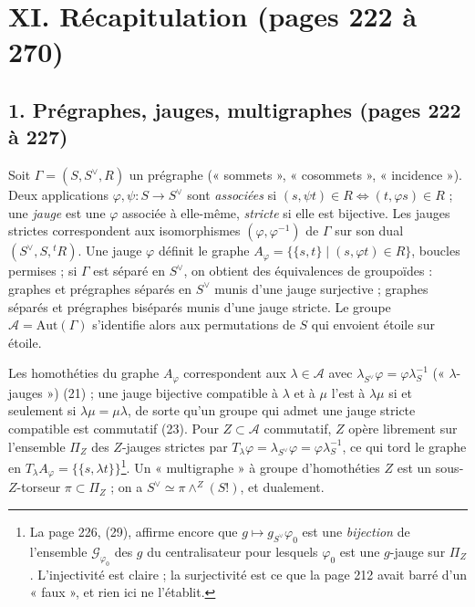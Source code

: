 \documentclass[11pt,a4paper]{article}
\begin{document}
\section*{XI. Récapitulation (pages 222 à 270)}

\subsection*{1. Prégraphes, jauges, multigraphes (pages 222 à 227)}

Soit $\Gamma = (S, S^{\vee}, R)$ un prégraphe (« sommets », « cosommets »,
« incidence »). Deux applications $\varphi, \psi : S \to S^{\vee}$ sont
\emph{associées} si $(s, \psi t) \in R \iff (t, \varphi s) \in R$ ; une
\emph{jauge} est une $\varphi$ associée à elle-même, \emph{stricte} si elle est
bijective. Les jauges strictes correspondent aux isomorphismes $(\varphi,
\varphi^{-1})$ de $\Gamma$ sur son dual $(S^{\vee}, S, {}^{t}R)$. Une jauge
$\varphi$ définit le graphe $A_\varphi = \{\{s, t\} \mid (s, \varphi t) \in
R\}$, boucles permises ; si $\Gamma$ est séparé en $S^{\vee}$, on obtient des
équivalences de groupoïdes : graphes et prégraphes séparés en $S^{\vee}$ munis
d'une jauge surjective ; graphes séparés et prégraphes biséparés munis d'une
jauge stricte. Le groupe $\mathcal{A} = \mathrm{Aut}(\Gamma)$ s'identifie alors
aux permutations de $S$ qui envoient étoile sur étoile.

Les homothéties du graphe $A_\varphi$ correspondent aux $\lambda \in \mathcal{A}$
avec $\lambda_{S^{\vee}}\varphi = \varphi\lambda_S^{-1}$ (« $\lambda$-jauges »)
(21) ; une jauge bijective compatible à $\lambda$ et à $\mu$ l'est à $\lambda\mu$
si et seulement si $\lambda\mu = \mu\lambda$, de sorte qu'un groupe qui admet une
jauge stricte compatible est commutatif (23). Pour $Z \subset \mathcal{A}$
commutatif, $Z$ opère librement sur l'ensemble $\Pi_Z$ des $Z$-jauges strictes
par $T_\lambda\varphi = \lambda_{S^{\vee}}\varphi = \varphi\lambda_S^{-1}$, ce
qui tord le graphe en $T_\lambda A_\varphi = \{\{s, \lambda t\}\}$\footnote{La
page 226, (29), affirme encore que $g \mapsto g_{S^{\vee}}\varphi_0$ est une
\emph{bijection} de l'ensemble $\mathcal{G}_{\varphi_0}$ des $g$ du
centralisateur pour lesquels $\varphi_0$ est une $g$-jauge sur $\Pi_Z$.
L'injectivité est claire ; la surjectivité est ce que la page 212 avait
barré d'un « faux », et rien ici ne l'établit.}. Un « multigraphe » à groupe
d'homothéties $Z$ est un sous-$Z$-torseur $\pi \subset \Pi_Z$ ; on a $S^{\vee}
\simeq \pi \wedge^{Z} (S!)$, et dualement.
\end{document}
